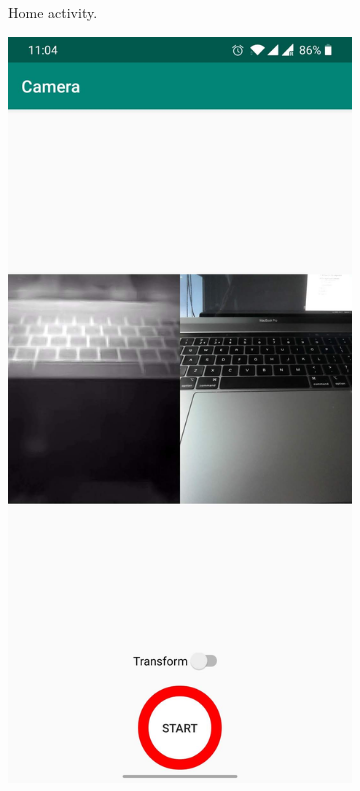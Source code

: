 \documentclass{l4proj}
\begin{document}
\begin{appendices}
\begin{figure}[ht]
\begin{subfigure}[h!]{0.32\textwidth}
    \caption{Home activity.}
    \label{fig:app_activities_home}
  \end{subfigure}
  \begin{subfigure}[h!]{0.32\textwidth}
    \includegraphics[width=\textwidth]{images/app/camera.jpg}

\end{subfigure}
\end{figure}
\end{appendices}
\end{document}
